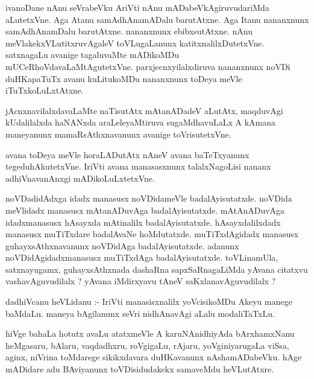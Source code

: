 \documentclass{article}
\begin{document}
\begin{mn}
ivanoDane  nAnu  seVrabeVku  AriVti  nAnu  mADabeVkAgiruvudariMda  aLutetxVne.  Aga  Atanu  samAdhAnamADalu  barutAtxne.  
Aga  Itanu  nananxnunx  samAdhAnamDalu  barutAtxne.  nananxnunx  ebibxsutAtxne.  nAnu  meVlakekxVLutitxruvAgaleV  
toVLugaLanunx  katitxnalilxDutetxVne.  satxnagaLu  avanige  tagaluvaMte  mADikoMDu  mUCeRhoVdavaLaMtAgutetxVne.  
parxjecnxyilalxdiruva  nananxnunx  noVDi  duHKapaTuTx  avanu kuLitukoMDu  nananxnunx  toDeya  meVle  iTuTxkoLuLxtAtxne.
\end{mn}

\begin{mn}
jAcnxnavilalxdavaLaMte  naTisutAtx  mAtanADadeV  aLutAtx,  maqduvAgi  kUdalilalxda  haNANxda  araLeleyaMtiruva  
sugaMdhavuLaLx  A  kAmana  maneyanunx  mamaRsAthxnavanunx  avanige  toVrisutetxVne.
\end{mn}

\begin{mn}
avana  toDeya  meVle  horaLADutAtx  nAneV  avana  baTeTxyanunx  tegeduhAkutetxVne.  IriVti  avana  manasasxnunx  
talalxNagoLisi  nananx  adhiVnavanAnxgi  mADikoLuLxtetxVne.
\end{mn}

\begin{mn}
noVDadidAdxga  idadx  manasusx  noVDidameVle  badalAyisutatxde.  noVDida  meVlidadx  manasusx  mAtanADuvAga  badalAyisutatxde.  
mAtAnADuvAga  idadxmanasusx  hAsayxda  mAtinalilx  badalAyisutatxde.  hAsayxdalilxdadx  manasusx  muTiTxdare  badalAvaNe  
hoMdutatxde.  muTiTxdAgidadx  manasusx  guhayxsAthxnavanunx  noVDidAga  badalAyisutatxde.  adanunx  noVDidAgidadxmanasusx  
muTiTxdAga  badalAyisutatxde.  toVLinamUla,  satxnayugamx,  guhayxsAthxnada  dashaRna  sapxSaRnagaLiMda  yAvana  citatxvu  
vashavAguvudilalx ?  yAvana  iMdirxyavu  tAneV  saKxlanavAguvudilalx ?
\end{mn}

\begin{mn}
dadhiVcanu  heVLidanu :- IriVti  manasisxnalilx  yoVcisikoMDu  Akeyu  manege  baMdaLu.  maneya  bAgilanunx  
seVri  nidhAnavAgi  aLalu  modaliTaTxLu.
\end{mn}

\begin{mn}
hiVge  bahaLa  hotutx  avaLu  atatxmeVle  A  karuNAnidhiyAda  bArxhamxNanu  heMgasaru,  bAlaru,  vaqdadhxru,  
roVgigaLu,  rAjaru,  yoVginiyarugaLa  viSsa,  aginx,  niVrina  toMdarege  sikikxdavara  duHKavanunx  nAshamADabeVku.  
hAge  mADidare  adu  BAviyanunx  toVDisidudakekx  samaveMdu  heVLutAtxre.
\end{mn}
\end{document}
